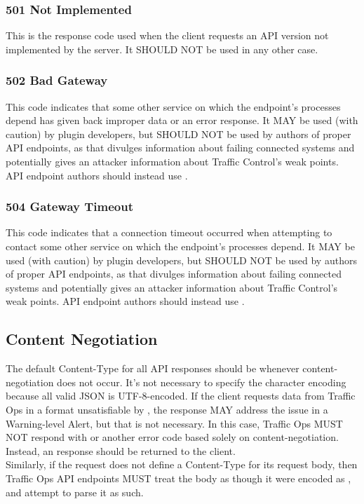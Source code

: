 \subsubsection{501 Not Implemented}
This is the response code used when the client requests an API version not implemented by the server. It SHOULD NOT be used in any other case.

\subsubsection{502 Bad Gateway}
This code indicates that some other service on which the endpoint's processes depend has given back improper data or an error response. It MAY be used
(with caution) by plugin developers, but SHOULD NOT be used by authors of proper API endpoints, as that divulges information about failing connected systems
and potentially gives an attacker information about Traffic Control's weak points. API endpoint authors should instead use .

\subsubsection{504 Gateway Timeout}
This code indicates that a connection timeout occurred when attempting to contact some other service on which the endpoint's processes depend. It MAY be used
(with caution) by plugin developers, but SHOULD NOT be used by authors of proper API endpoints, as that divulges information about failing connected systems
and potentially gives an attacker information about Traffic Control's weak points. API endpoint authors should instead use .

\subsection{Content Negotiation}
The default Content-Type for all API responses should be  whenever content-negotiation does not occur. It's not
necessary to specify the character encoding because all valid JSON is UTF-8-encoded. If the client requests data from Traffic Ops in a
format unsatisfiable by , the response MAY address the issue in a Warning-level Alert, but that is not
necessary. In this case, Traffic Ops MUST NOT respond with  or another error code based solely on content-negotiation.
Instead, an  response should be returned to the client.\\
Similarly, if the request does not define a Content-Type for its request body, then Traffic Ops API endpoints MUST treat the body as though it
were encoded as , and attempt to parse it as such.

